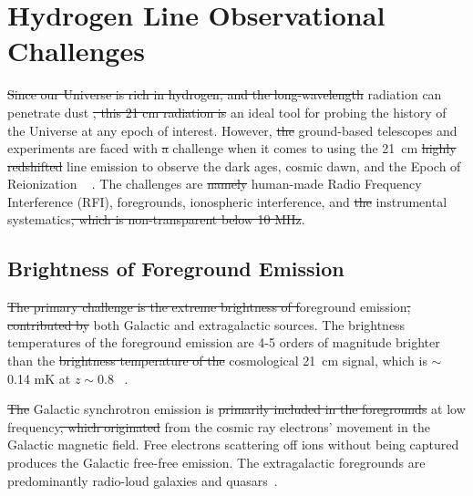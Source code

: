 	    \section{Hydrogen Line Observational Challenges}
	    
	    \st{Since our Universe is rich in hydrogen, and the long-wavelength}  radiation can penetrate dust  \st{, this 21 cm radiation is}  an ideal tool for probing the history of the Universe at any epoch of interest. However, \st{the} ground-based telescopes and experiments are faced with \st{a}  challenge when it comes to using the  \SI{21}{cm} \st{highly redshifted} line emission to observe the dark ages, cosmic dawn, and the Epoch of Reionization ~\citep{2016ExA....41..271R} . The  challenges are \st{namely} human-made Radio Frequency Interference  (RFI),  foregrounds, ionospheric interference, and \st{the} instrumental systematics\st{, which is non-transparent below 10 MHz}. 
	    
	    \subsection*{Brightness of Foreground Emission}
	    
	    \st{The primary challenge is the extreme brightness of f}oreground emission\st{, contributed by}  both Galactic and extragalactic sources.
	    The brightness temperatures of the foreground emission are 4-5 orders of magnitude brighter than  the \st{brightness temperature of the} cosmological \SI{21}{cm} signal, which is $\sim$ 0.14 mK at $z\sim0.8$ ~\citep{2018RAA....18..114H}. 
	    
	    \st{The} Galactic synchrotron emission is \st{primarily included in the foregrounds}  at low frequency\st{, which originated}  from the cosmic ray electrons' movement in the Galactic magnetic field. Free electrons scattering off ions without being captured produces the Galactic free-free emission. The extragalactic foregrounds are predominantly radio-loud galaxies and quasars~\citep{2018RAA....18..114H, 2008MNRAS.389.1319J}.
	    
